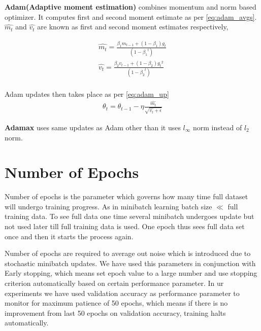 \noindent \textbf{Adam(Adaptive moment estimation)}\cite{adam} combines momentum and norm based optimizer. It computes first and second moment estimate as per \ref{eq:adam_avgs}. $\hat{m_t}$ and $\hat{v_t}$ are known as first and second moment estimates respectively, 

\begin{equation}\label{eq:adam_avgs}
\begin{aligned}
\hat{m_t}=\frac{\beta_1 m_{t-1}+(1-\beta_1)g_t}{(1-{\beta_1}^t)} \\
\hat{v_t}=\frac{\beta_2 v_{t-1}+(1-\beta_2){g_t}^2}{(1-{\beta_2}^t)}\\
\end{aligned}
\end{equation}

\noindent Adam updates then takes place as per \ref{eq:adam_up}
\begin{equation}\label{eq:adam_up}
\begin{aligned}
\theta_t=\theta_{t-1} - \eta\frac{\hat{m_t}}{\sqrt{\hat{v_t}+\epsilon}}
\end{aligned}
\end{equation}

\noindent \textbf{Adamax}\cite{adam} uses same updates as Adam other than it uses $l_{\infty}$ norm instead of $l_2$ norm.


\section{Number of Epochs}

Number of epochs is the parameter which governs how many time full dataset will undergo training progress. As in minibatch learning batch size $\ll$ full training data. To see full data one time several minibatch undergoes update but not used later till full training data is used. One epoch thus sees full data set once and then it starts the process again.

Number of epochs are required to average out noise which is introduced due to stochastic minibatch updates. 
We have used this parameters in conjunction with Early stopping, which means set epoch value to a large number and use stopping criterion automatically based on certain performance parameter. In ur experiments we have used validation accuracy as performance parameter to monitor for maximum patience of 50 epochs, which means if there is no improvement from last 50 epochs on validation accuracy, training halts automatically.


